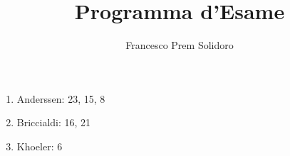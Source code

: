\documentclass[17pt]{article}
\title{Programma d'Esame}
\author{Francesco Prem Solidoro}
\begin{document}
\maketitle
\hspace{4in}
\begin{enumerate}
    \item { Anderssen: 23, 15, 8 }
    \item { Briccialdi: 16, 21 }
    \item { Khoeler: 6 }
\end{enumerate}
\end{document}
